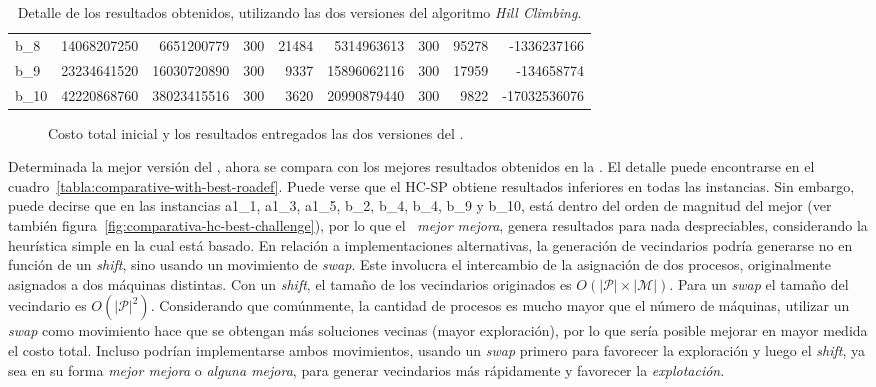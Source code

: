 \documentclass[../informe2.tex]{subfiles}
\begin{document}
\begin{table}[ht!]
{\begin{tabular}{@{}lrrrrrrrr@{}}
b\_8      & 14068207250                 & 6651200779             & 300                        & 21484                           & 5314963613                & 300                        & 95278                           & -1336237166                    \\
b\_9      & 23234641520                 & 16030720890            & 300                        & 9337                            & 15896062116               & 300                        & 17959                           & -134658774                     \\
b\_10     & 42220868760                 & 38023415516            & 300                        & 3620                            & 20990879440               & 300                        & 9822                            & -17032536076                   \\ \bottomrule
\end{tabular}}
\caption{\small Detalle de los resultados obtenidos, utilizando las dos versiones del algoritmo \textit{Hill Climbing}.}\label{tabla:hc-comparative}
\end{table}

\bigskip

\begin{figure}[ht!]
	\caption{\small Costo total inicial y los resultados entregados las dos versiones del \hillc.}\label{fig:comparativa-hc}
\end{figure}

\noindent Determinada la mejor versión del \hillc, ahora se compara con los mejores resultados obtenidos en la \roadef. El detalle puede encontrarse en el cuadro~\ref{tabla:comparative-with-best-roadef}. Puede verse que el HC-SP obtiene resultados inferiores en todas las instancias. Sin embargo, puede decirse que en las instancias a1\_1, a1\_3, a1\_5, b\_2, b\_4, b\_4, b\_9 y b\_10, está dentro del orden de magnitud del mejor (ver también            figura~\ref{fig:comparativa-hc-best-challenge}), por lo que el \hillc\ \textit{mejor mejora}, genera resultados para nada despreciables, considerando la heurística simple en la cual está basado. En relación a implementaciones alternativas, la generación de vecindarios podría generarse no en función de un \textit{shift}, sino usando un movimiento de \textit{swap}. Este involucra el intercambio de la asignación de dos procesos, originalmente asignados a dos máquinas distintas. Con un \textit{shift}, el tamaño de los vecindarios originados es $O(|\mathcal{P}|\times|\mathcal{M}|)$. Para un \textit{swap} el tamaño del vecindario es $O(|\mathcal{P}|^{2})$. Considerando que comúnmente, la cantidad de procesos es mucho mayor que el número de máquinas, utilizar un \textit{swap} como movimiento hace que se obtengan más soluciones vecinas (mayor exploración), por lo que sería posible mejorar en mayor medida el costo total. Incluso podrían implementarse ambos movimientos, usando un \textit{swap} primero para favorecer la exploración y luego el \textit{shift}, ya sea en su forma \textit{mejor mejora} o \textit{alguna mejora}, para generar vecindarios más rápidamente y favorecer la \textit{explotación}.
\end{document}
